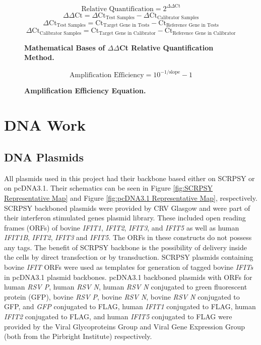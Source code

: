 \begin{figure}
$$\mbox{Relative Quantification} = 2^{\Delta\Delta \mbox{Ct}}$$
$$\Delta\Delta \mbox{Ct} = \Delta \mbox{Ct}_{\mbox{Test Samples}}-\Delta \mbox{Ct}_{\mbox{Calibrator Samples}}$$
$$\Delta \mbox{Ct}_{\mbox{Test Samples}} = \mbox{Ct}_{\mbox{Target Gene in Tests}}-\mbox{Ct}_{\mbox{Reference Gene in Tests}}$$
$$\Delta \mbox{Ct}_{\mbox{Calibrator Samples}} = \mbox{Ct}_{\mbox{Target Gene in Calibrator}}-\mbox{Ct}_{\mbox{Reference Gene in Calibrator}}$$
\caption[Mathematical Bases of $\Delta\Delta$Ct Relative Quantification Method.]{\textbf{Mathematical Bases of $\Delta\Delta$Ct Relative Quantification Method.}}
\label{eq:Mathematical Bases of delta delta Ct Relative Quantification Method}
\end{figure}

\begin{figure}
$$\mbox{Amplification Efficiency} = 10^{-1/\mbox{slope}}-1$$
\caption[Amplification Efficiency Equation.]{\textbf{Amplification Efficiency Equation.}}
\label{eq:Amplification Efficiency Equation}
\end{figure}




\section{DNA Work} \label{sec:DNA Work}
\subsection{DNA Plasmids} \label{subsec:DNA Plasmids}
All plasmids used in this project had their backbone based either on SCRPSY or on pcDNA3.1. Their schematics can be seen in Figure \ref{fig:SCRPSY Representative Map} and Figure \ref{fig:pcDNA3.1 Representative Map}, respectively. SCRPSY backboned plasmids were provided by CRV Glasgow and were part of their interferon stimulated genes plasmid library. These included open reading frames (ORFs) of bovine \textit{IFIT1}, \textit{IFIT2}, \textit{IFIT3}, and \textit{IFIT5} as well as human \textit{IFIT1B}, \textit{IFIT2}, \textit{IFIT3} and \textit{IFIT5}. The ORFs in these constructs do not possess any tags. The benefit of SCRPSY backbone is the possibility of delivery inside the cells by direct transfection or by transduction. SCRPSY plasmids containing bovine \textit{IFIT} ORFs were used as templates for generation of tagged bovine \textit{IFITs} in pcDNA3.1 plasmid backbones. pcDNA3.1 backboned plasmids with ORFs for human \textit{RSV P}, human \textit{RSV N}, human \textit{RSV N} conjugated to green fluorescent protein (GFP), bovine \textit{RSV P}, bovine \textit{RSV N}, bovine \textit{RSV N} conjugated to GFP, and \textit{GFP} conjugated to FLAG, human \textit{IFIT1} conjugated to FLAG, human \textit{IFIT2} conjugated to FLAG, and human \textit{IFIT5} conjugated to FLAG were provided by the Viral Glycoproteins Group and Viral Gene Expression Group (both from the Pirbright Institute) respectively.

